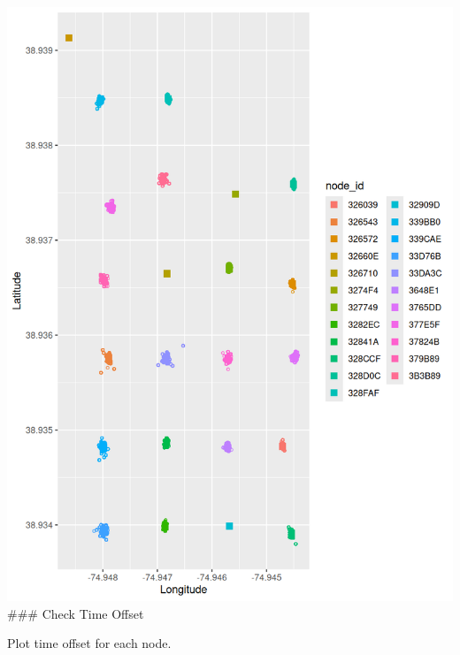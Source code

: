 \documentclass[
]{book}
\begin{document}
\includegraphics{images/node_check_1.3_node_locations.png}
\#\#\# Check Time Offset

Plot time offset for each node.
\end{document}
